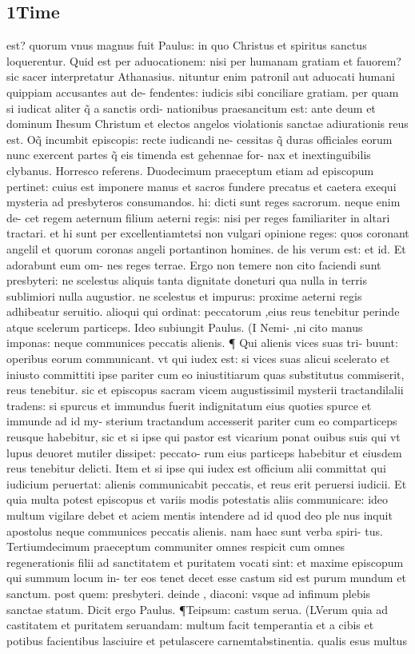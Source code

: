 \documentclass{article}
\begin{document}
\begin{pages}
\section*{1Time }
\marginpar{[ p.210 ]}\pstart est? quorum vnus magnus fuit Paulus: in quo Christus et spiritus sanctus loquerentur. Quid est per aduocationem: nisi per humanam gratiam et fauorem? sic sacer interpretatur Athanasius. nituntur enim patronil aut aduocati humani quippiam accusantes aut de- fendentes: iudicis sibi conciliare gratiam. per quam si iudicat aliter q̃ a sanctis ordi- nationibus praesancitum est: ante deum et dominum Ihesum Christum et electos angelos  violationis sanctae adiurationis reus est. Oq̃ incumbit episcopis: recte iudicandi ne- cessitas q̃ duras officiales eorum nunc exercent partes q̃ eis timenda est gehennae for- nax et inextinguibilis clybanus. Horresco referens. Duodecimum praeceptum etiam ad episcopum pertinet: cuius est imponere manus et sacros fundere precatus et caetera exequi mysteria ad presbyteros consumandos. hi: dicti sunt reges sacrorum. neque enim de- cet regem aeternum filium aeterni regis: nisi per reges familiariter in altari tractari. et hi sunt per excellentiamtetsi non vulgari opinione reges: quos coronant angelil et quorum coronas angeli portantinon homines. de his verum est: et id. Et adorabunt eum om- nes reges terrae. Ergo non temere non cito faciendi sunt presbyteri: ne scelestus aliquis tanta dignitate doneturi qua nulla in terris sublimiori nulla augustior. ne scelestus et impurus: proxime aeterni regis adhibeatur seruitio. alioqui qui ordinat: peccatorum ,eius reus tenebitur perinde atque scelerum particeps. Ideo subiungit Paulus. (I Nemi- ,ni cito manus imponas: neque communices peccatis alienis. ¶ Qui alienis vices suas tri- buunt: operibus eorum communicant. vt qui iudex est: si vices suas alicui scelerato et iniusto committiti ipse pariter cum eo iniustitiarum quas substitutus commiserit, reus tenebitur. sic et episcopus sacram vicem augustissimil mysterii tractandilalii tradens: si spurcus et immundus fuerit indignitatum eius quoties spurce et immunde ad id my- sterium tractandum accesserit pariter cum eo comparticeps reusque habebitur, sic et si ipse qui pastor est vicarium ponat ouibus suis qui vt lupus deuoret mutiler dissipet: peccato- rum eius particeps habebitur et eiusdem reus tenebitur delicti. Item et si ipse qui iudex est officium alii committat qui iudicium peruertat: alienis communicabit peccatis, et reus erit peruersi iudicii. Et quia multa potest episcopus et variis modis potestatis aliis communicare: ideo multum vigilare debet et aciem mentis intendere ad id quod deo ple nus inquit apostolus neque communices peccatis alienis. nam haec sunt verba spiri- tus. Tertiumdecimum praeceptum communiter omnes respicit cum omnes regenerationis filii ad sanctitatem et puritatem vocati sint: et maxime episcopum qui summum locum in- ter eos tenet decet esse castum sid est purum mundum et sanctum. post quem: presbyteri. deinde , diaconi: vsque ad infimum plebis sanctae statum. Dicit ergo Paulus. ¶Teipsum: castum serua. (LVerum quia ad castitatem et puritatem seruandam: multum facit temperantia  et a cibis et potibus facientibus lasciuire et petulascere carnemtabstinentia. qualis esus multus 
\end{pages}
\end{document}
